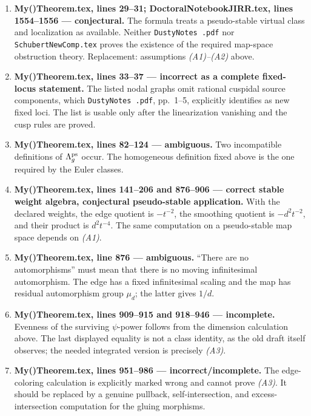 \documentclass[12pt]{memoir}
\begin{document}
\begin{enumerate}
 \item \textbf{My()Theorem.tex, lines 29--31; DoctoralNotebookJIRR.tex,
 lines 1554--1556 --- conjectural.}  The formula treats a pseudo-stable
 virtual class and localization as available.  Neither
 \texttt{DustyNotes .pdf} nor \texttt{SchubertNewComp.tex} proves the
 existence of the required map-space obstruction theory.  Replacement:
 assumptions \emph{(A1)--(A2)} above.

 \item \textbf{My()Theorem.tex, lines 33--37 --- incorrect as a complete
 fixed-locus statement.}  The listed nodal graphs omit rational cuspidal
 source components, which \texttt{DustyNotes .pdf}, pp.~1--5, explicitly
 identifies as new fixed loci.  The list is usable only after the
 linearization vanishing and the cusp rules are proved.

 \item \textbf{My()Theorem.tex, lines 82--124 --- ambiguous.}  Two
 incompatible definitions of \(\Lambda_g^{\operatorname{\mathrm{ps}}}\) occur.  The homogeneous
 definition fixed above is the one required by the Euler classes.

 \item \textbf{My()Theorem.tex, lines 141--206 and 876--906 --- correct
 stable weight algebra, conjectural pseudo-stable application.}  With the
 declared weights, the edge quotient is \(-t^{-2}\), the smoothing
 quotient is \(-d^2t^{-2}\), and their product is \(d^2t^{-4}\).
 The same computation on a pseudo-stable map space depends on \emph{(A1)}.

 \item \textbf{My()Theorem.tex, line 876 --- ambiguous.}  ``There are no
 automorphisms'' must mean that there is no moving infinitesimal
 automorphism.  The edge has a fixed infinitesimal scaling and the map has
 residual automorphism group \(\mu_d\); the latter gives \(1/d\).

 \item \textbf{My()Theorem.tex, lines 909--915 and 918--946 ---
 incomplete.}  Evenness of the surviving \(\psi\)-power follows from the
 dimension calculation above.  The last displayed equality is not a class
 identity, as the old draft itself observes; the needed integrated version
 is precisely \emph{(A3)}.

 \item \textbf{My()Theorem.tex, lines 951--986 --- incorrect/incomplete.}
 The edge-coloring calculation is explicitly marked wrong and cannot prove
 \emph{(A3)}.  It should be replaced by a genuine pullback,
 self-intersection, and excess-intersection computation for the gluing
 morphisms.


\end{enumerate}
\end{document}
